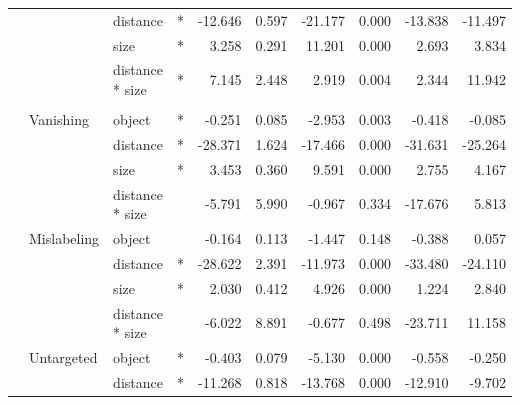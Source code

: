 \documentclass[
]{article}
\begin{document}
\begin{longtable}[t]{llllrrrrrr}
\cmidrule{3-10}\nopagebreak
\hspace{1em} &  & distance & * & -12.646 & 0.597 & -21.177 & 0.000 & -13.838 & -11.497\\
\cmidrule{3-10}\nopagebreak
\hspace{1em} &  & size & * & 3.258 & 0.291 & 11.201 & 0.000 & 2.693 & 3.834\\
\cmidrule{3-10}\nopagebreak
\hspace{1em} &  & distance * size & * & 7.145 & 2.448 & 2.919 & 0.004 & 2.344 & 11.942\\
\cmidrule{1-10}\pagebreak[0]
\addlinespace[0.3em]
\multicolumn{10}{l}{\textbf{RetinaNet}}\\
\hspace{1em} & Vanishing & object & * & -0.251 & 0.085 & -2.953 & 0.003 & -0.418 & -0.085\\
\cmidrule{3-10}\nopagebreak
\hspace{1em} &  & distance & * & -28.371 & 1.624 & -17.466 & 0.000 & -31.631 & -25.264\\
\cmidrule{3-10}\nopagebreak
\hspace{1em} &  & size & * & 3.453 & 0.360 & 9.591 & 0.000 & 2.755 & 4.167\\
\cmidrule{3-10}\nopagebreak
\hspace{1em} &  & distance * size &  & -5.791 & 5.990 & -0.967 & 0.334 & -17.676 & 5.813\\
\cmidrule{2-10}\nopagebreak
\hspace{1em} & Mislabeling & object &  & -0.164 & 0.113 & -1.447 & 0.148 & -0.388 & 0.057\\
\cmidrule{3-10}\nopagebreak
\hspace{1em} &  & distance & * & -28.622 & 2.391 & -11.973 & 0.000 & -33.480 & -24.110\\
\cmidrule{3-10}\nopagebreak
\hspace{1em} &  & size & * & 2.030 & 0.412 & 4.926 & 0.000 & 1.224 & 2.840\\
\cmidrule{3-10}\nopagebreak
\hspace{1em} &  & distance * size &  & -6.022 & 8.891 & -0.677 & 0.498 & -23.711 & 11.158\\
\cmidrule{2-10}\nopagebreak
\hspace{1em} & Untargeted & object & * & -0.403 & 0.079 & -5.130 & 0.000 & -0.558 & -0.250\\
\cmidrule{3-10}\nopagebreak
\hspace{1em} &  & distance & * & -11.268 & 0.818 & -13.768 & 0.000 & -12.910 & -9.702\\

\end{longtable}
\end{document}
